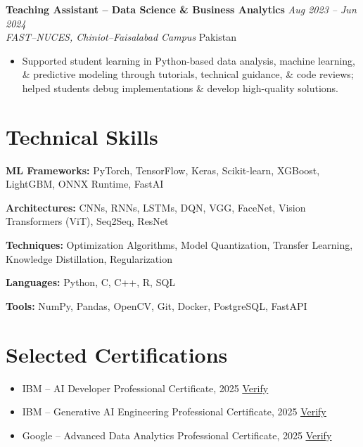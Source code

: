 \documentclass[10.5pt,a4paper]{article}
\newcommand{\entry}[4]{%
    \noindent
    \noindent\textbf{#1} \hfill \textit{#2}\\
    \textit{#3} \hfill #4\\[-1pt]
}
\begin{document}
\vspace{3pt}

\entry
{Teaching Assistant -- Data Science \& Business Analytics}
{Aug 2023 -- Jun 2024}
{FAST--NUCES, Chiniot--Faisalabad Campus}
{Pakistan}

\begin{itemize}
\item Supported student learning in Python-based data analysis, machine learning, \& predictive modeling through tutorials, technical guidance, \& code reviews; helped students debug implementations \& develop high-quality solutions.
\end{itemize}


\section*{Technical Skills}

\noindent\textbf{ML Frameworks:}
PyTorch, TensorFlow, Keras, Scikit-learn, XGBoost, LightGBM, ONNX Runtime, FastAI

\noindent\textbf{Architectures:}
CNNs, RNNs, LSTMs, DQN, VGG, FaceNet, Vision Transformers (ViT), Seq2Seq, ResNet

\noindent\textbf{Techniques:}
Optimization Algorithms, Model Quantization, Transfer Learning, Knowledge Distillation,
Regularization

\noindent\textbf{Languages:}
Python, C, C++, R, SQL

\noindent\textbf{Tools:}
NumPy, Pandas, OpenCV, Git, Docker, PostgreSQL, FastAPI


\section*{Selected Certifications}

\begin{itemize}
    \item IBM -- AI Developer Professional Certificate, 2025
    \hfill
\href{https://www.coursera.org/account/accomplishments/professional-cert/AUXO12A3KUE7}{\underline{Verify}}
    \item IBM -- Generative AI Engineering Professional Certificate, 2025
    \hfill
\href{https://www.coursera.org/account/accomplishments/professional-cert/55VL0VUWMJYK}{\underline{Verify}}
    \item Google -- Advanced Data Analytics Professional Certificate, 2025
    \hfill
\href{https://www.coursera.org/account/accomplishments/professional-cert/RS5PNGTXG6GM}{\underline{Verify}}
\end{itemize}
\end{document}
